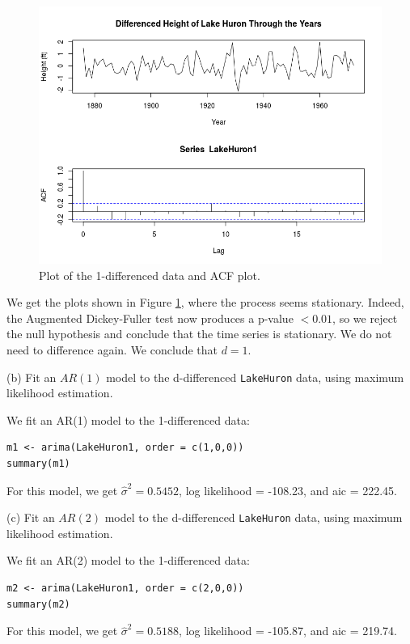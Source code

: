 \documentclass[]{article}
\begin{document}
\begin{figure}[!ht]
\centering
\includegraphics[width=.8\textwidth]{huron1plot.png}
\caption{Plot of the 1-differenced data and ACF plot.}
\label{huron1plot}
\end{figure}


We get the plots shown in Figure \ref{huron1plot}, where the process seems stationary. Indeed, the Augmented Dickey-Fuller test now produces a p-value $< 0.01$, so we reject the null hypothesis and conclude that the time series is stationary. We do not need to difference again. We conclude that $d=1$.

\color{black}

(b) Fit an $AR(1)$ model to the d-differenced \texttt{LakeHuron} data, using maximum likelihood estimation.

\color{blue}
We fit an AR(1) model to the 1-differenced data:

\begin{Verbatim}[frame=single]
m1 <- arima(LakeHuron1, order = c(1,0,0))
summary(m1)
\end{Verbatim}

For this model, we get $\hat{\sigma}^2 = 0.5452$, log likelihood = -108.23, and aic = 222.45.
\color{black}

(c) Fit an $AR(2)$ model to the d-differenced \texttt{LakeHuron} data, using maximum likelihood estimation.

\color{blue}
We fit an AR(2) model to the 1-differenced data:

\begin{Verbatim}[frame=single]
m2 <- arima(LakeHuron1, order = c(2,0,0))
summary(m2)
\end{Verbatim}

For this model, we get $\hat{\sigma}^2 = 0.5188$, log likelihood = -105.87, and aic = 219.74.
\color{black}
\end{document}
